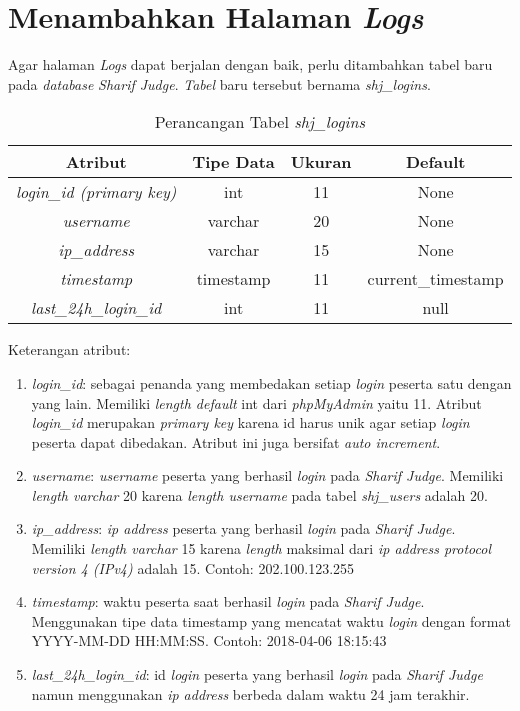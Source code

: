 \section{Menambahkan Halaman \textit{Logs}}%
Agar halaman \textit{Logs} dapat berjalan dengan baik, perlu ditambahkan tabel baru pada \textit{database} \textit{Sharif Judge}.  \textit{Tabel} baru tersebut bernama \textit{shj\_logins}. 
\begin{table}[H] %
	\centering 
	\caption{Perancangan Tabel \textit{shj\_logins}}
	\label{tab:tabellogs}
		\begin{tabular}{|c|c|c|c|}
			\hline
			\textbf{Atribut} & \textbf{Tipe Data} & \textbf{Ukuran}  & \textbf{Default} \\
			\hline
			\textit{login\_id (primary key)} & int & 11  & None \\
			\hline
			\textit{username} & varchar & 20  & None \\
			\hline
			\textit{ip\_address} & varchar & 15  & None \\
			\hline
			\textit{timestamp} & timestamp & 11  & current\_timestamp \\
			\hline
			\textit{last\_24h\_login\_id}	 & int & 11  & null \\
			\hline
		\end{tabular}
\end{table}

Keterangan atribut:
\begin{enumerate}
	\item \textit{login\_id}: sebagai penanda yang membedakan setiap \textit{login} peserta satu dengan yang lain. Memiliki \textit{length default} int dari \textit{phpMyAdmin} yaitu 11. Atribut \textit{login\_id} merupakan \textit{primary key} karena id harus unik agar setiap \textit{login} peserta dapat dibedakan. Atribut ini juga bersifat \textit{auto increment}.
	\item \textit{username}: \textit{username} peserta yang berhasil \textit{login} pada \textit{Sharif Judge}. Memiliki \textit{length varchar} 20 karena \textit{length username} pada tabel \textit{shj\_users} adalah 20.
	\item \textit{ip\_address}: \textit{ip address} peserta yang berhasil \textit{login} pada \textit{Sharif Judge}. Memiliki \textit{length varchar} 15 karena \textit{length} maksimal dari \textit{ip address protocol version 4 (IPv4)} adalah 15. Contoh: 202.100.123.255
	\item \textit{timestamp}: waktu peserta saat berhasil \textit{login} pada \textit{Sharif Judge}. Menggunakan tipe data timestamp yang mencatat waktu \textit{login} dengan format YYYY-MM-DD HH:MM:SS. Contoh: 2018-04-06 18:15:43
	\item \textit{last\_24h\_login\_id}: id \textit{login} peserta yang berhasil \textit{login} pada \textit{Sharif Judge} namun menggunakan \textit{ip address} berbeda dalam waktu 24 jam terakhir.
\end{enumerate}

